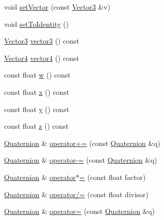 \begin{DoxyCompactItemize}
void \hyperlink{classprism_1_1geometry_1_1_quaternion_af4fc8ac6fcf8863ff950e86f0fa3818c}{set\+Vector} (const \hyperlink{classprism_1_1geometry_1_1_vector3}{Vector3} \&v)
\item 
void \hyperlink{classprism_1_1geometry_1_1_quaternion_a3d252bf3af1c5b47a751b1dd2f1a41db}{set\+To\+Identity} ()
\item 
\hyperlink{classprism_1_1geometry_1_1_vector3}{Vector3} \hyperlink{classprism_1_1geometry_1_1_quaternion_a30c6e8a2b8e29c614c648d9a39bdcdb5}{vector3} () const 
\item 
\hyperlink{classprism_1_1geometry_1_1_vector4}{Vector4} \hyperlink{classprism_1_1geometry_1_1_quaternion_a48b3332d56095978d7fec1d36b92ac1c}{vector4} () const 
\item 
const float \hyperlink{classprism_1_1geometry_1_1_quaternion_a04d1be00d79966209148fc9e0dcd8d29}{w} () const 
\item 
const float \hyperlink{classprism_1_1geometry_1_1_quaternion_a64b19a3673ae2d7a103ad4edfb70874f}{x} () const 
\item 
const float \hyperlink{classprism_1_1geometry_1_1_quaternion_a1eb758ab66dc23e282d8d9c1d891db25}{y} () const 
\item 
const float \hyperlink{classprism_1_1geometry_1_1_quaternion_a0555ec659f2dff30070bfa05c129aa1b}{z} () const 
\item 
\hyperlink{classprism_1_1geometry_1_1_quaternion}{Quaternion} \& \hyperlink{classprism_1_1geometry_1_1_quaternion_af05bb28c35f48d15ac7b3eec49b2a7ff}{operator+=} (const \hyperlink{classprism_1_1geometry_1_1_quaternion}{Quaternion} \&q)
\item 
\hyperlink{classprism_1_1geometry_1_1_quaternion}{Quaternion} \& \hyperlink{classprism_1_1geometry_1_1_quaternion_adea1af08c2b429ce660f1c99c6c662a9}{operator-\/=} (const \hyperlink{classprism_1_1geometry_1_1_quaternion}{Quaternion} \&q)
\item 
\hyperlink{classprism_1_1geometry_1_1_quaternion}{Quaternion} \& \hyperlink{classprism_1_1geometry_1_1_quaternion_a226f4860803f811bf8e0d43f5c61e2e7}{operator$\ast$=} (const float factor)
\item 
\hyperlink{classprism_1_1geometry_1_1_quaternion}{Quaternion} \& \hyperlink{classprism_1_1geometry_1_1_quaternion_a635087bcba716782643b2f880c07668b}{operator/=} (const float divisor)
\item 
\hyperlink{classprism_1_1geometry_1_1_quaternion}{Quaternion} \& \hyperlink{classprism_1_1geometry_1_1_quaternion_a3d9cef9f68af77b97fe71157a1fd1591}{operator=} (const \hyperlink{classprism_1_1geometry_1_1_quaternion}{Quaternion} \&q)
\end{DoxyCompactItemize}
